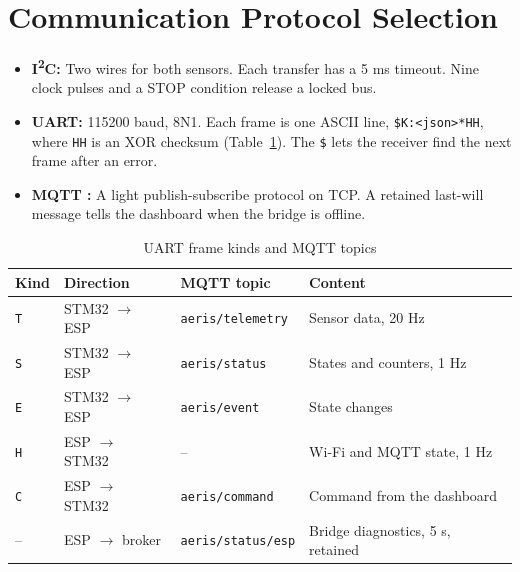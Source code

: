 \documentclass[12pt,a4paper]{report}
\begin{document}
\section{Communication Protocol Selection}
\begin{itemize}
\item \textbf{I\textsuperscript{2}C:} Two wires for both sensors. Each transfer has a 5 ms timeout. Nine clock pulses and a STOP condition release a locked bus.
\item \textbf{UART:} 115200 baud, 8N1. Each frame is one ASCII line, \texttt{\$K:<json>*HH}, where \texttt{HH} is an XOR checksum (Table~\ref{tab:frames}). The \texttt{\$} lets the receiver find the next frame after an error.
\item \textbf{MQTT \cite{mqtt}:} A light publish-subscribe protocol on TCP. A retained last-will message tells the dashboard when the bridge is offline.
\end{itemize}

\begin{table}[H]
\centering
\caption{UART frame kinds and MQTT topics}
\label{tab:frames}
\small
\begin{tabularx}{\textwidth}{l l l X}
\toprule
\textbf{Kind} & \textbf{Direction} & \textbf{MQTT topic} & \textbf{Content}\\
\midrule
\texttt{T} & STM32 $\rightarrow$ ESP & \texttt{aeris/telemetry} & Sensor data, 20 Hz\\
\texttt{S} & STM32 $\rightarrow$ ESP & \texttt{aeris/status} & States and counters, 1 Hz\\
\texttt{E} & STM32 $\rightarrow$ ESP & \texttt{aeris/event} & State changes\\
\texttt{H} & ESP $\rightarrow$ STM32 & -- & Wi-Fi and MQTT state, 1 Hz\\
\texttt{C} & ESP $\rightarrow$ STM32 & \texttt{aeris/command} & Command from the dashboard\\
-- & ESP $\rightarrow$ broker & \texttt{aeris/status/esp} & Bridge diagnostics, 5 s, retained\\
\bottomrule
\end{tabularx}
\end{table}
\end{document}
